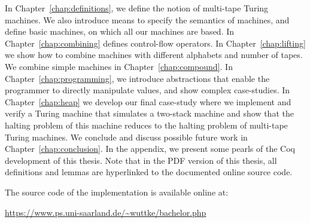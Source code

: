 In Chapter~\ref{chap:definitions}, we define the notion of multi-tape Turing machines.  We also introduce means to specify the semantics of machines,
and define basic machines, on which all our machines are based.  In Chapter~\ref{chap:combining} defines control-flow operators.  In
Chapter~\ref{chap:lifting} we show how to combine machines with different alphabets and number of tapes.  We combine simple machines in
Chapter~\ref{chap:compound}.  In Chapter~\ref{chap:programming}, we introduce abstractions that enable the programmer to directly manipulate values,
and show complex case-studies.  In Chapter~\ref{chap:heap} we develop our final case-study where we implement and verify a Turing machine that
simulates a two-stack machine and show that the halting problem of this machine reduces to the halting problem of multi-tape Turing machines.  We
conclude and discuss possible future work in Chapter~\ref{chap:conclusion}.  In the appendix, we present some pearls of the Coq development of this
thesis.  Note that in the PDF version of this thesis, all definitions and lemmas are hyperlinked to the documented online source code.

The source code of the implementation is available online at:
\begin{center}
  \url{https://www.ps.uni-saarland.de/~wuttke/bachelor.php}
\end{center}


